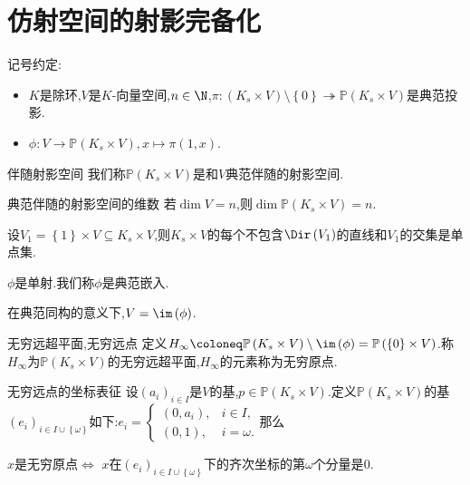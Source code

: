 \section{仿射空间的射影完备化}

记号约定:

\begin{itemize}
	\item $K$是除环,$V$是$K$-向量空间,$n\in\N$,$\pi:\left(K_{s}\times V\right)\setminus\left\{0\right\}\twoheadrightarrow\mathbb{P}\left(K_{s}\times V\right)$是典范投影.
	\item $\phi:V\to\mathbb{P}\left(K_{s}\times V\right),x\mapsto\pi\left(1,x\right)$.
\end{itemize}

\begin{definition}{伴随射影空间}{}
	我们称$\mathbb{P}\left(K_{s}\times V\right)$是和$V$典范伴随的射影空间.
\end{definition}

\begin{proposition}{典范伴随的射影空间的维数}{}
	若$\dim V=n$,则$\dim\mathbb{P}\left(K_{s}\times V\right)=n$.
\end{proposition}

\begin{proposition}{}{}
	设$V_{1}=\left\{1\right\}\times V\subseteq K_{s}\times V$,则$K_{s}\times V$的每个不包含$\Dir\left(V_{1}\right)$的直线和$V_{1}$的交集是单点集.
\end{proposition}

\begin{proposition}{}{}
	$\phi$是单射.我们称$\phi$是典范嵌入.
\end{proposition}

\begin{remark}{}{}
	在典范同构的意义下,$V=\im\left(\phi\right)$.
\end{remark}

\begin{definition}{无穷远超平面,无穷远点}{}
	定义$H_{\infty}\coloneq\mathbb{P}\left(K_{s}\times V\right)\setminus\im\left(\phi\right)=\mathbb{P}\left(\left\{0\right\}\times V\right)$.称$H_{\infty}$为$\mathbb{P}\left(K_{s}\times V\right)$的无穷远超平面,$H_{\infty}$的元素称为无穷原点.
\end{definition}

\begin{proposition}{无穷远点的坐标表征}{}
	设$\left(a_{i}\right)_{i\in I}$是$V$的基,$p\in\mathbb{P}\left(K_{s}\times V\right)$.定义$\mathbb{P}\left(K_{s}\times V\right)$的基$\left(e_{i}\right)_{i\in I\cup\left\{\omega\right\}}$如下:$e_{i}=\begin{cases}
		\left(0,a_{i}\right),&i\in I,\\
		\left(0,1\right),&i=\omega.
	\end{cases}$那么
	\begin{center}
		$x$是无穷原点$\iff$ $x$在$\left(e_{i}\right)_{i\in I\cup\left\{\omega\right\}}$下的齐次坐标的第$\omega$个分量是$0$.
	\end{center}
\end{proposition}

